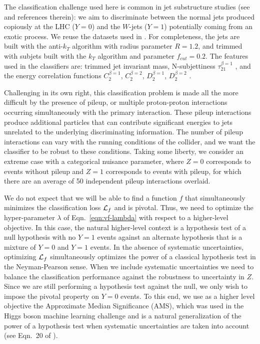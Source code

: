 \documentclass{article}
\theoremstyle{plain}
\begin{document}
The classification challenge used here is common in jet substructure
studies (see \citep{Khachatryan:2014vla,ATL-PHYS-PUB-2015-033,wbosonATLAS} and
references therein): we aim to discriminate between the normal jets produced copiously
at the LHC ($Y=0$) and the $W$-jets ($Y=1$) potentially coming from an exotic process.
We reuse the datasets used in
\citep{baldi2016jet}.  For completeness, the jets are built with the
anti-$k_T$ algorithm \citep{Cacciari:2008gp}
with radius parameter $R=1.2$, and trimmed \citep{Krohn:2009th} with subjets built with
the $k_T$ algorithm and parameter $f_{cut}=0.2$. The features used
in the classifiers are: trimmed jet invariant mass, N-subjettiness
$\tau_{21}^{\beta=1}$ \citep{nsub,Thaler2012}, and the energy correlation
functions  $C_{2}^{\beta=1}$, $C_{2}^{\beta=2}$,
$D_{2}^{\beta=1}$, $D_{2}^{\beta=2}$ \citep{Larkoski2013}.

Challenging in its own right, this classification
problem is made all the more difficult by the presence of pileup, or multiple
 proton-proton interactions occurring simultaneously with the primary
interaction.  These pileup interactions produce additional particles that can
contribute significant energies to jets unrelated to the underlying
discriminating information. The number of pileup interactions can vary with
the running conditions of the collider, and we want the classifier to be robust
to these conditions. Taking some liberty, we consider an extreme case with
a categorical nuisance parameter, where $Z=0$ corresponds to events without pileup
and $Z=1$ corresponds to events with pileup, for which there are an average  of
50 independent pileup interactions overlaid.

We do not expect that we will be able to find a function $f$ that simultaneously
minimizes the classification loss ${\cal L}_f$ and is pivotal. Thus, we need to optimize
the hyper-parameter $\lambda$ of Eqn.~\ref{eqn:vf-lambda} with respect to
a higher-level objective. In this case, the natural higher-level context is a
hypothesis test of a null hypothesis with no $Y=1$ events against an
alternate hypothesis that is a mixture of $Y=0$ and $Y=1$ events.
In the absence of systematic uncertainties, optimizing ${\cal L}_f$ simultaneously
optimizes the power of a classical hypothesis test in the Neyman-Pearson sense.
When we include systematic uncertainties we need to balance the
classification performance against the robustness to uncertainty in $Z$.
Since we are still performing a hypothesis test against the null, we only
wish to impose the pivotal property on $Y=0$ events. To this end,
we use as a higher level objective the Approximate Median Significance (AMS), which was used
in the Higgs boson machine learning challenge and is a natural generalization
of the power of a hypothesis test when systematic uncertainties are taken into account
(see Eqn.~20 of \citep{adam2014higgs}).
\end{document}
